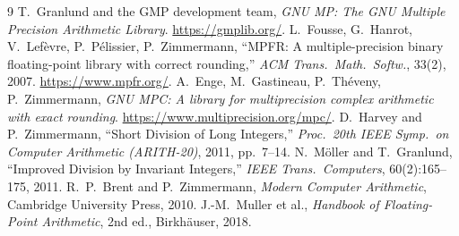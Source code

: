\documentclass[uplatex,dvipdfmx,a4paper,11pt]{jsarticle}
\begin{document}
\begin{thebibliography}{9}
 T.~Granlund and the GMP development team,
  \emph{GNU MP: The GNU Multiple Precision Arithmetic Library}.
  \url{https://gmplib.org/}.
 L.~Fousse, G.~Hanrot, V.~Lef\`evre, P.~P\'elissier, P.~Zimmermann,
  ``MPFR: A multiple-precision binary floating-point library with correct
  rounding,'' \emph{ACM Trans.\ Math.\ Softw.}, 33(2), 2007.
  \url{https://www.mpfr.org/}.
 A.~Enge, M.~Gastineau, P.~Th\'eveny, P.~Zimmermann,
  \emph{GNU MPC: A library for multiprecision complex arithmetic with exact
  rounding}. \url{https://www.multiprecision.org/mpc/}.
 D.~Harvey and P.~Zimmermann,
  ``Short Division of Long Integers,''
  \emph{Proc.\ 20th IEEE Symp.\ on Computer Arithmetic (ARITH-20)}, 2011,
  pp.~7--14.
 N.~M\"oller and T.~Granlund,
  ``Improved Division by Invariant Integers,''
  \emph{IEEE Trans.\ Computers}, 60(2):165--175, 2011.
 R.~P.~Brent and P.~Zimmermann,
  \emph{Modern Computer Arithmetic}, Cambridge University Press, 2010.
 J.-M.~Muller et al.,
  \emph{Handbook of Floating-Point Arithmetic}, 2nd ed., Birkh\"auser, 2018.
\end{thebibliography}
\end{document}
